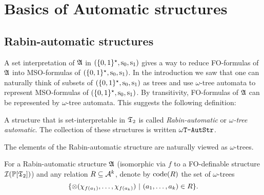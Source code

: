 \iffalse
?? ALT DFN ??

\begin{definition}
\begin{enumerate}
\item A structure FO-interpretable in $\Power_f(\frakT_1)$ is called {\em finite-string automatic}.
\item A structure FO-interpretable in $\Power(\frakT_1)$ is called {\em $\omega$-string automatic}.
\item A structure FO-interpretable in $\Power_f(\frakT_2)$ is called {\em finite-tree automatic}.
\item A structure FO-interpretable in $\Power(\frakT_2)$ is called {\em $\omega$-tree automatic}.
\end{enumerate}
\end{definition}
\fi
\section{Basics of Automatic structures} \label{AS:sec:autstr}

\subsection{Rabin-automatic structures}

A set interpretation of $\mathfrak{A}$ in $\mbox{$(\{0,1\}^{\star},\mathrm{s}_0, \mathrm{s}_1)$}$ gives a way to reduce FO-formulas of $\mathfrak{A}$ into MSO-formulas of $\mbox{$(\{0,1\}^{\star},\mathrm{s}_0, \mathrm{s}_1)$}$. 
In the introduction we saw that one can naturally think of subsets of $\mbox{$(\{0,1\}^{\star},\mathrm{s}_0, \mathrm{s}_1)$}$ as trees and use $\omega$-tree automata to represent 
MSO-formulas of $\mbox{$(\{0,1\}^{\star},\mathrm{s}_0, \mathrm{s}_1)$}$. By transitivity, FO-formulas of $\mathfrak{A}$ can be represented by $\omega$-tree automata. This suggests the following definition:

\begin{definition} \label{AS:dfn:raut} \cite{Blum99} 
A structure that is set-interpretable in $\mathfrak{T}_2$ is called {\em Rabin-automatic} or {\em $\omega$-tree automatic}. 
The collection of these structures is written $\mbox{\tt $\omega$T-AutStr}$.
\end{definition}

The elements of the Rabin-automatic structure are naturally viewed as $\omega$-trees. 

\begin{definition}
For a Rabin-automatic structure $\mathfrak{A}$ (isomorphic via $f$ to a FO-definable structure ${\mathcal I}({\mathbb P}[\mathfrak{T}_2])$) and any relation $R \subseteq {\mathcal A}^k$, denote by
${\rm code}({R})$ the set of $\omega$-trees 
\[\{\otimes(\chi_{f(a_1)},\dots,\chi_{f(a_k)}) \ \vert \   (a_1,\dots,a_k) \in R\}.\]
\end{definition}

